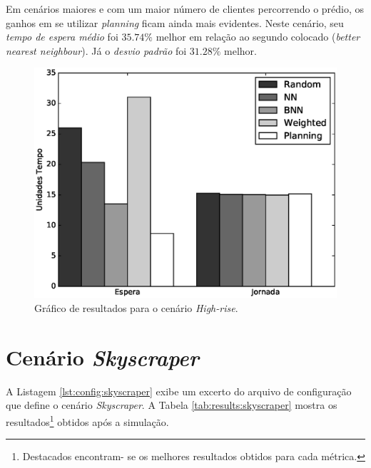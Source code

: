 Em cenários maiores e com um maior número de clientes percorrendo o prédio, os
ganhos em se utilizar \textit{planning} ficam ainda mais evidentes. Neste
cenário, seu \textit{tempo de espera médio} foi $35.74\%$ melhor em relação ao
segundo colocado (\textit{better nearest neighbour}). Já o \textit{desvio padrão}
foi $31.28\%$ melhor.

\begin{figure}[htb!]
  \centering
  \includegraphics[scale=0.6]{img/high-rise-average-times-chart}
  \caption{Gráfico de resultados para o cenário \textit{High-rise}.}
  \label{fig:result:average:high-rise}
\end{figure}

\section{Cenário \textit{Skyscraper}}
A Listagem \ref{lst:config:skyscraper} exibe um excerto do arquivo de
configuração que define o cenário \textit{Skyscraper}. A Tabela
\ref{tab:results:skyscraper} mostra os resultados\footnote{Destacados encontram-
se os melhores resultados obtidos para cada métrica.} obtidos após a simulação.


